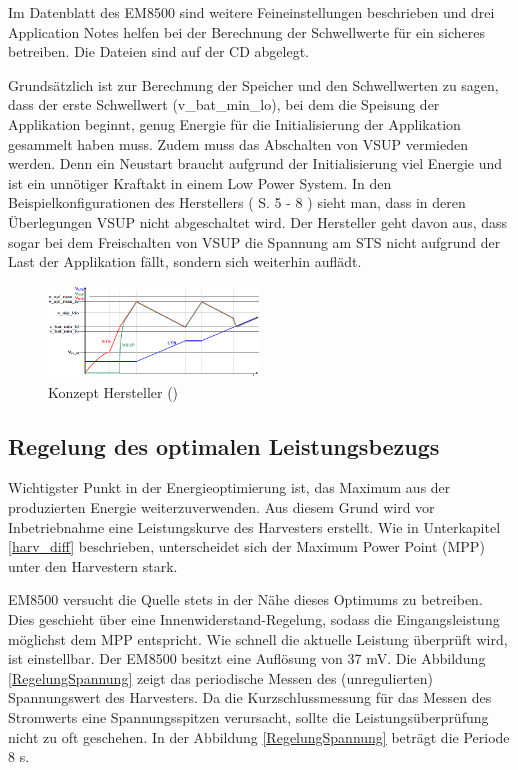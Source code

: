 Im Datenblatt des EM8500 \cite{datasheet_EM85} sind weitere Feineinstellungen beschrieben und drei Application Notes helfen bei der Berechnung der Schwellwerte für ein sicheres betreiben. Die Dateien sind auf der CD abgelegt.

Grundsätzlich ist zur Berechnung der Speicher und den Schwellwerten zu sagen, dass der erste Schwellwert (v\_bat\_min\_lo), bei dem die Speisung der Applikation beginnt, genug Energie für die Initialisierung der Applikation gesammelt haben muss. Zudem muss das Abschalten von VSUP vermieden werden. Denn ein Neustart braucht aufgrund der Initialisierung viel Energie und ist ein unnötiger Kraftakt in einem Low Power System. In den Beispielkonfigurationen des Herstellers (\cite{datasheet_EM85} S. 5 - 8 ) sieht man, dass in deren Überlegungen VSUP nicht abgeschaltet wird. Der Hersteller geht davon aus, dass sogar bei dem Freischalten von VSUP die Spannung am STS nicht aufgrund der Last der Applikation fällt, sondern sich weiterhin auflädt.

\begin{figure}[ht]
   \includegraphics[width=0.5\textwidth]{2TheoretischeGrundlagen/imag/KonzeptFirma.png}
   \caption{Konzept Hersteller (\cite{datasheet_EM85})}
   \label{energiespeisung_lts} 
\end{figure}


\subsection{Regelung des optimalen Leistungsbezugs}
\label{optimaleLeistung}

Wichtigster Punkt in der Energieoptimierung ist, das Maximum aus der produzierten Energie weiterzuverwenden. Aus diesem Grund wird vor Inbetriebnahme eine Leistungskurve des Harvesters erstellt. Wie in Unterkapitel \ref{harv_diff} beschrieben, unterscheidet sich der Maximum Power Point (MPP) unter den Harvestern stark.

EM8500 versucht die Quelle stets in der Nähe dieses Optimums zu betreiben. Dies geschieht über eine Innenwiderstand-Regelung, sodass die Eingangsleistung möglichst dem MPP entspricht. Wie schnell die aktuelle Leistung überprüft wird, ist einstellbar. Der EM8500 besitzt eine Auflösung von 37 mV. Die Abbildung \ref{RegelungSpannung} zeigt das periodische Messen des (unregulierten) Spannungswert des Harvesters. Da die Kurzschlussmessung für das Messen des Stromwerts eine Spannungsspitzen verursacht, sollte die Leistungsüberprüfung nicht zu oft geschehen. In der Abbildung \ref{RegelungSpannung} beträgt die Periode 8 s.

